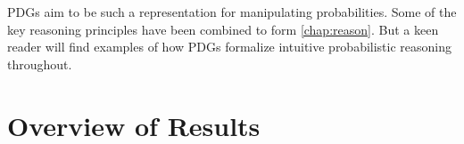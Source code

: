 
PDGs aim to be such a representation for manipulating probabilities.
Some of the key reasoning principles have been combined to form \cref{chap:reason}.
But a keen reader will find examples of how PDGs formalize intuitive probabilistic reasoning throughout. 

\section{Overview of Results}

\TODO